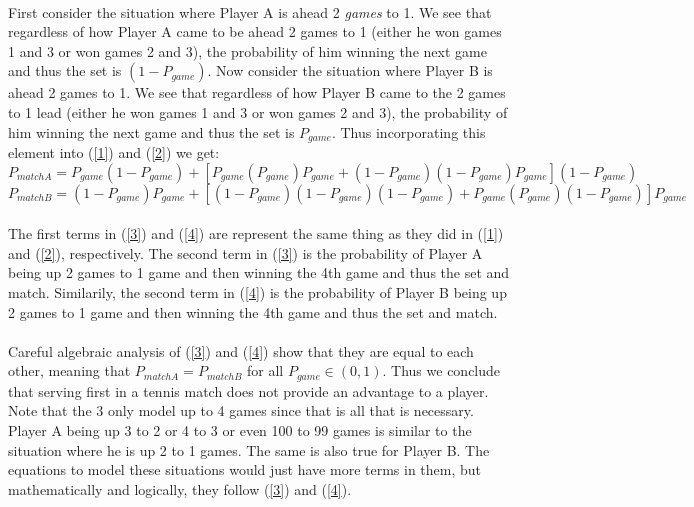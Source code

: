 \documentclass[12pt]{article}
\begin{document}
\paragraph{} First consider the situation where Player A is ahead 2 \emph{games} to 1. We see that regardless of how Player A came to be ahead 2 games to 1 (either he won games 1 and 3 or won games 2 and 3), the probability of him winning the next game and thus the set is $(1-P_{game})$. Now consider the situation where Player B is ahead 2 games to 1. We see that regardless of how Player B came to the 2 games to 1 lead (either he won games 1 and 3 or won games 2 and 3), the probability of him winning the next game and thus the set is $P_{game}$. Thus incorporating this element into (\ref{1}) and (\ref{2}) we get:
\begin{equation}
P_{matchA}=P_{game}(1-P_{game})+[P_{game}(P_{game})P_{game}+(1-P_{game})(1-P_{game})P_{game}](1-P_{game})
\label{3}
\end{equation} 
\begin{equation}
P_{matchB}=(1-P_{game})P_{game}+[(1-P_{game})(1-P_{game})(1-P_{game})+P_{game}(P_{game})(1-P_{game})]P_{game}
\label{4}
\end{equation}

\paragraph{} The first terms in (\ref{3}) and (\ref{4}) are represent the same thing as they did in (\ref{1}) and (\ref{2}), respectively. The second term in (\ref{3}) is the probability of Player A being up 2 games to 1 game and then winning the 4th game and thus the set and match. Similarily, the second term in (\ref{4}) is the probability of Player B being up 2 games to 1 game and then winning the 4th game and thus the set and match. 

\paragraph{}Careful algebraic analysis of (\ref{3}) and (\ref{4}) show that they are equal to each other, meaning that $P_{matchA}=P_{matchB}$ for all $P_{game}\in(0,1)$. Thus we conclude that serving first in a tennis match does not provide an advantage to a player. Note that the 3 only model up to 4 games since that is all that is necessary. Player A being up 3 to 2 or 4 to 3 or even 100 to 99 games is similar to the situation where he is up 2 to 1 games. The same is also true for Player B. The equations to model these situations would just have more terms in them, but mathematically and logically, they follow (\ref{3}) and (\ref{4}).
\end{document}
